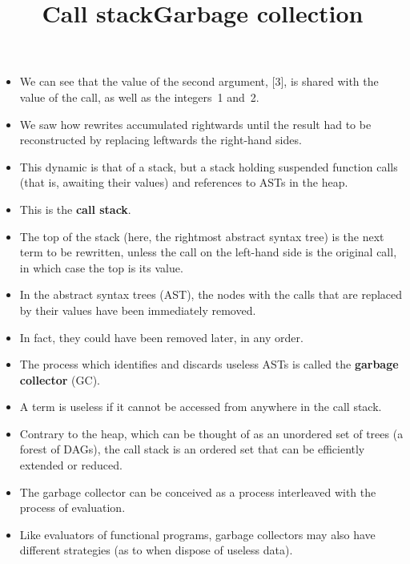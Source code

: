 \documentclass[wide]{slides}
\begin{document}
\begin{slide}
  \title{Call stack}

  \begin{itemize}

    \item We can see that the value of the second argument, [3], is
      shared with the value of the call, as well as the integers~1
      and~2.

    \item We saw how rewrites accumulated rightwards until the result
      had to be reconstructed by replacing leftwards the right-hand
      sides.

    \item This dynamic is that of a stack, but a stack holding
      suspended function calls (that is, awaiting their values) and
      references to ASTs in the heap.

    \item This is the \textbf{call stack}.

    \item The top of the stack (here, the rightmost abstract syntax
      tree) is the next term to be rewritten, unless the call on the
      left\hyp{}hand side is the original call, in which case the top
      is its value.

  \end{itemize}

\end{slide}

\begin{slide}
  \title{Garbage collection}

  \begin{itemize}

    \item In the abstract syntax trees (AST), the nodes with the calls
      that are replaced by their values have been immediately removed.

    \item In fact, they could have been removed later, in any order.

    \item The process which identifies and discards useless ASTs is
      called the \textbf{garbage collector} (GC).

    \item A term is useless if it cannot be accessed from anywhere in
      the call stack.

    \item Contrary to the heap, which can be thought of as an
      unordered set of trees (a forest of DAGs), the call stack is an
      ordered set that can be efficiently extended or reduced.

    \item The garbage collector can be conceived as a process
      interleaved with the process of evaluation.

    \item Like evaluators of functional programs, garbage collectors
      may also have different strategies (as to when dispose of
      useless data).
  \end{itemize}

\end{slide}
\end{document}
